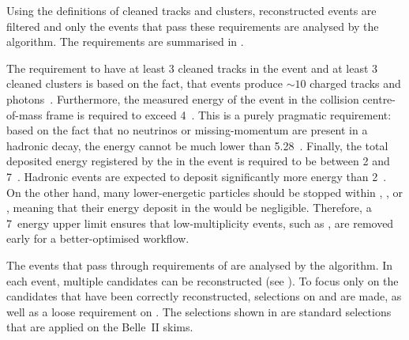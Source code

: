 Using the definitions of cleaned tracks and \ECL clusters, reconstructed events are filtered and only the events that pass these requirements are analysed by the \FEI algorithm.
The requirements are summarised in .

\begin{table}[htbp!]
    \centering
     \caption{\label{tab:fei_precuts} Selections before running the \FEI algorithm.
     Cleaned tracks and clusters are defined in .
     }
\end{table}
The requirement to have at least 3 cleaned tracks in the event and at least 3 cleaned \ECL clusters is based on the fact, that \BB events produce $\sim10$ charged tracks and photons~\cite{BaBar:2014omp}.
Furthermore, the measured energy of the event in the \epem collision centre-of-mass frame is required to exceed 4~\gev.
This is a purely pragmatic requirement: based on the fact that no neutrinos or missing-momentum are present in a hadronic decay, the energy cannot be much lower than 5.28~\gev.
Finally, the total deposited energy registered by the \ECL in the event is required to be between 2 and 7~\gev.
Hadronic events are expected to deposit significantly more energy than 2~\gev.
On the other hand, many lower-energetic particles should be stopped within \PXD, \SVD, \CDC or \TOP, meaning that their energy deposit in the \ECL would be negligible.
Therefore, a 7~\gev \ECL energy upper limit ensures that low-multiplicity events, such as \epem\ra\epem, are removed early for a better-optimised workflow.

The events that pass through requirements of  are analysed by the \FEI algorithm.
In each event, multiple \FEI candidates can be reconstructed (see ).
To focus only on the candidates that have been correctly reconstructed, selections on \DeltaE and \Mbc are made, as well as a loose requirement on \feiProb.
The selections shown in  are standard selections that are applied on the Belle~II \FEI skims.

